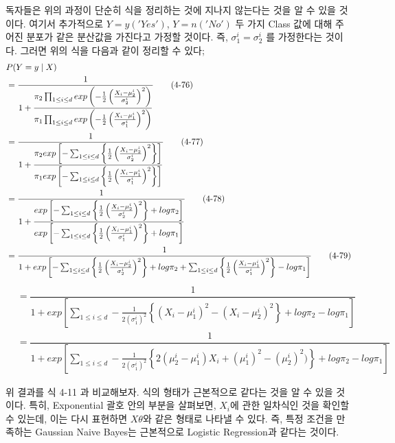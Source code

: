 \documentclass[a4paper]{oblivoir}
\begin{document}
\indent 독자들은 위의 과정이 단순히 식을 정리하는 것에 지나지 않는다는 것을 알 수 있을 것이다. 여기서 추가적으로 $Y=y('Yes')$, $Y=n('No')$ 두 가지 Class 값에 대해 주어진 분포가 같은 분산값을 가진다고 가정할 것이다. 즉, $\sigma_{1}^{i} = \sigma_{2}^{i}$ 를 가정한다는 것이다. 그러면 위의 식을 다음과 같이 정리할 수 있다;
\begin{align}
&P(Y=y\mid X) \notag \\
&=\dfrac{1}{1+\dfrac{\pi_{2}\prod_{1 \leq i \leq d}exp\left(-\frac{1}{2}\left(\frac{X_{i}-\mu_{2}^{i}}{\sigma_{2}^{i}} \right)^{2} \right)}{\pi_{1}\prod_{1 \leq i \leq d}exp\left(-\frac{1}{2}\left(\frac{X_{i}-\mu_{1}^{i}}{\sigma_{1}^{i}} \right)^{2} \right)}} \tag{4-76}\\
&=\dfrac{1}{1+\dfrac{\pi_{2}exp\left[-\sum_{1 \leq i \leq d}\left\{\frac{1}{2}\left(\frac{X_{i}-\mu_{2}^{i}}{\sigma_{2}^{i}} \right)^{2} \right\} \right]}{\pi_{1}exp\left[-\sum_{1 \leq i \leq d}\left\{\frac{1}{2}\left(\frac{X_{i}-\mu_{1}^{i}}{\sigma_{1}^{i}} \right)^{2} \right\} \right]}}	 \tag{4-77}\\
&=\dfrac{1}{1+\dfrac{exp\left[-\sum_{1 \leq i \leq d}\left\{\frac{1}{2}\left(\frac{X_{i}-\mu_{2}^{i}}{\sigma_{2}^{i}} \right)^{2} \right\}+log \pi_{2} \right]}{exp\left[-\sum_{1 \leq i \leq d}\left\{\frac{1}{2}\left(\frac{X_{i}-\mu_{1}^{i}}{\sigma_{1}^{i}} \right)^{2} \right\}+log \pi_{1} \right]}} \tag{4-78}\\
&=\dfrac{1}{1+exp\left[-\sum_{1 \leq i \leq d}\left\{\frac{1}{2}\left(\frac{X_{i}-\mu_{2}^{i}}{\sigma_{2}^{i}} \right)^{2} \right\}+log \pi_{2}+\sum_{1 \leq i \leq d}\left\{\frac{1}{2}\left(\frac{X_{i}-\mu_{1}^{i}}{\sigma_{1}^{i}} \right)^{2} \right\} -log \pi_{1} \right]} \tag{4-79}
\end{align}
\begin{align}
&=\dfrac{1}{1+exp\left[\sum_{1 \leq i \leq d}-\frac{1}{2(\sigma_{1}^{i})^{2}}\left\{ (X_{i}-\mu_{1}^{i})^{2} -(X_{i}-\mu_{2}^{i})^{2}\right\}+log \pi_{2}-log \pi_{1} \right]} \tag{4-80}\\
&=\dfrac{1}{1+exp\left[\sum_{1 \leq i \leq d}-\frac{1}{2(\sigma_{1}^{i})^{2}}\left\{2(\mu_{2}^{i}-\mu_{1}^{i})X_{i} + (\mu_{1}^{i})^{2} - (\mu_{2}^{i})^{2}) \right\}+log \pi_{2}-log \pi_{1} \right]} \tag{4-81}
\end{align}

\indent 위 결과를 식 4-11 과 비교해보자. 식의 형태가 근본적으로 같다는 것을 알 수 있을 것이다. 특히, Exponential 괄호 안의 부분을 살펴보면, $X_{i}$에 관한 일차식인 것을 확인할 수 있는데, 이는 다시 표현하면 \textbf{$X\theta$}와 같은 형태로 나타낼 수 있다. 즉, 특정 조건을 만족하는 Gaussian Naive Bayes는 근본적으로 Logistic Regression과 같다는 것이다.
\end{document}
